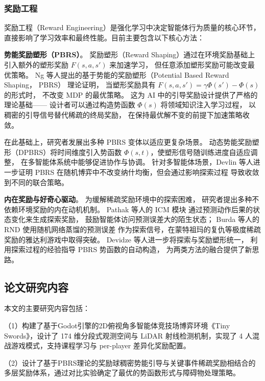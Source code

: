 \documentclass[12pt, a4paper, UTF8]{ctexart}
\numberwithin{equation}{section}
\begin{document}
\subsubsection{奖励工程}
\label{sec:reward_engineering}
奖励工程（Reward Engineering）是强化学习中决定智能体行为质量的核心环节，直接影响了学习效率和最终性能\cite{devidze2025rewarddesignreinforcementlearning}。目前主要包含以下核心方法：

\textbf{势能奖励塑形（PBRS）}。
奖励塑形（Reward Shaping）通过在环境奖励基础上引入额外的塑形奖励 $F(s,a,s')$ 来加速学习，
但任意添加塑形奖励可能改变最优策略。
Ng 等人\cite{Ng1999PolicyIU}提出的基于势能的奖励塑形（Potential Based Reward Shaping， PBRS） 理论证明，
当塑形奖励具有 $F(s,a,s') = \gamma\Phi(s') - \Phi(s)$ 的形式时，
不改变 MDP 的最优策略。
这为 AI 中的引导奖励设计提供了严格的理论基础——
设计者可以通过构造势函数 $\Phi(s)$ 将领域知识注入学习过程，
以稠密的引导信号替代稀疏的终局奖励，
在保持最优解不变的前提下加速策略收敛。

在此基础上，研究者发展出多种 PBRS 变体以适应更复杂场景。
动态势能奖励塑形（DPBRS）\cite{Devlin2014dynamicpotential}将时间维度引入势函数
$\Phi(s,t)$，使塑形信号随训练进度自适应调整，
在多智能体系统中能够促进协作与协调。
针对多智能体场景，Devlin 等人\cite{Devlin2014theoretical}进一步证明
PBRS 在随机博弈中不改变纳什均衡，但会通过影响探索过程
导致收敛到不同的联合策略。

\textbf{内在奖励与好奇心驱动}。
为缓解稀疏奖励环境中的探索困难，
研究者提出多种不依赖环境奖励的内在动机机制。
Pathak 等人\cite{pathak2017curiositydrivenexplorationselfsupervisedprediction}的 ICM 模块
通过预测动作后果的状态变化来生成探索奖励，
鼓励智能体访问预测误差大的陌生状态；
Burda 等人\cite{burda2018explorationrandomnetworkdistillation}的 RND 使用随机网络蒸馏的预测误差
作为探索信号，在蒙特祖玛的复仇等极度稀疏奖励的雅达利游戏中取得突破。
Devidze 等人\cite{Devidze2022explorationguided}进一步将探索与奖励塑形统一，
利用探索过程的经验指导 PBRS 势函数的自动构造，
为两类方法的融合提供了新思路。

\subsection{论文研究内容}
本文的主要研究内容包括：

（1）构建了基于Godot引擎的2D俯视角多智能体竞技场博弈环境《Tiny Swords》，设计了 174 维分段式观测空间与 LiDAR 射线检测机制，实现了 4 人混战游戏模式，支持课程学习与 per-player 差异化奖励配置。

（2）设计了基于PBRS理论的奖励球稠密势能引导与关键事件稀疏奖励相结合的多层奖励体系，通过对比实验确定了最优的势函数形式与障碍物处理策略。
\end{document}
